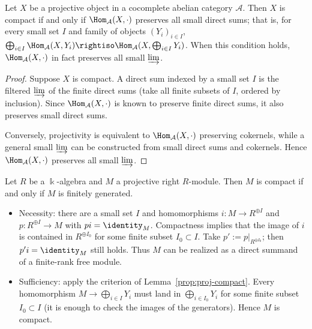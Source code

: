\begin{lemma}\label{prop:proj-compact}
	Let $X$ be a projective object in a cocomplete abelian category
	$\mathcal{A}$. Then $X$ is compact if and only if
	$\Hom_{\mathcal{A}}(X,\mathord\cdot)$ preserves all small direct sums;
	that is, for every small set $I$ and family of objects $(Y_i)_{i\in I}$,
	$\bigoplus_{i\in I}\Hom_{\mathcal{A}}(X,Y_i)\rightiso
	\Hom_{\mathcal{A}}(X,\bigoplus_{i\in I}Y_i)$.
	When this condition holds, $\Hom_{\mathcal{A}}(X,\mathord\cdot)$ in fact
	preserves all small $\varinjlim$.
\end{lemma}
\begin{proof}
	Suppose $X$ is compact. A direct sum indexed by a small set $I$ is the
	filtered $\varinjlim$ of the finite direct sums (take all finite subsets
	of $I$, ordered by inclusion). Since
	$\Hom_{\mathcal{A}}(X,\mathord\cdot)$ is known to preserve finite direct
	sums, it also preserves small direct sums.

	Conversely, projectivity is equivalent to
	$\Hom_{\mathcal{A}}(X,\mathord\cdot)$ preserving cokernels, while a
	general small $\varinjlim$ can be constructed from small direct sums and
	cokernels. Hence $\Hom_{\mathcal{A}}(X,\mathord\cdot)$ preserves all
	small $\varinjlim$.
\end{proof}

\begin{example}
	Let $R$ be a $\Bbbk$-algebra and $M$ a projective right $R$-module. Then
	$M$ is compact if and only if $M$ is finitely generated.
	\begin{itemize}
		\item Necessity: there are a small set $I$ and homomorphisms
		$i:M\to R^{\oplus I}$ and $p:R^{\oplus I}\to M$ with
		$pi=\identity_M$. Compactness implies that the image of $i$ is
		contained in $R^{\oplus I_0}$ for some finite subset $I_0\subset I$.
		Take $p':=p|_{R^{\oplus I_0}}$; then $p'i=\identity_M$ still holds.
		Thus $M$ can be realized as a direct summand of a finite-rank free
		module.
		\item Sufficiency: apply the criterion of
		Lemma~\ref{prop:proj-compact}. Every homomorphism
		$M\to\bigoplus_{i\in I}Y_i$ must land in
		$\bigoplus_{i\in I_0}Y_i$ for some finite subset $I_0\subset I$ (it
		is enough to check the images of the generators). Hence $M$ is compact.
	\end{itemize}
\end{example}

